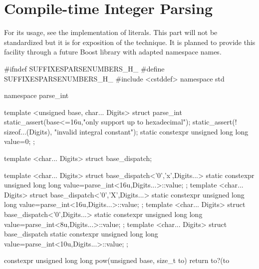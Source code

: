 \documentclass[ebook,11pt,article]{memoir}
\begin{document}
\section{Compile-time Integer Parsing}
For its usage, see the implementation of  literals. This part will not be standardized but it is for exposition of the technique. It is planned to provide this facility through a future Boost library with adapted namespace names.
\begin{codeblock}
#ifndef SUFFIXESPARSENUMBERS_H_
#define SUFFIXESPARSENUMBERS_H_
#include <cstddef>
namespace std {
namespace parse_int {
template <unsigned base, char... Digits>
struct parse_int{
    static_assert(base<=16u,"only support up to hexadecimal");
    static_assert(! sizeof...(Digits), "invalid integral constant");
    static constexpr unsigned long long value=0;
};

template <char... Digits>
struct base_dispatch;

template <char... Digits>
struct base_dispatch<'0','x',Digits...>{
    static constexpr unsigned long long value=parse_int<16u,Digits...>::value;
};
template <char... Digits>
struct base_dispatch<'0','X',Digits...>{
    static constexpr unsigned long long value=parse_int<16u,Digits...>::value;
};
template <char... Digits>
struct base_dispatch<'0',Digits...>{
    static constexpr unsigned long long value=parse_int<8u,Digits...>::value;
};
template <char... Digits>
struct base_dispatch{
    static constexpr unsigned long long value=parse_int<10u,Digits...>::value;
};

constexpr unsigned long long
pow(unsigned base, size_t to) {
    return to?(to%
}

}}
\end{codeblock}
\end{document}
